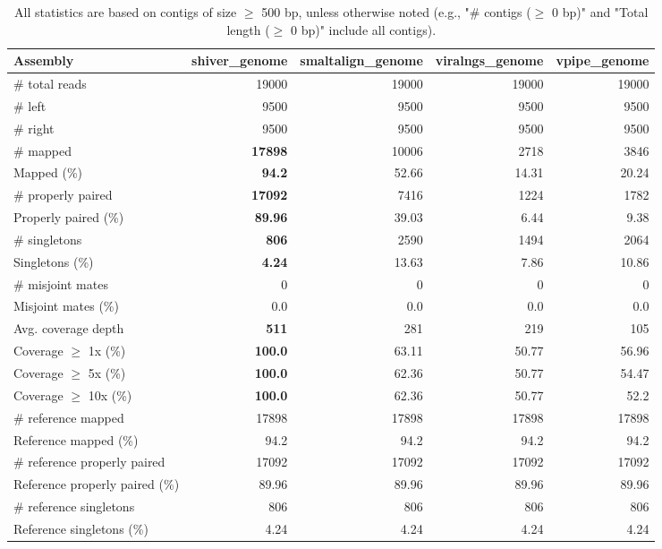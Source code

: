 \documentclass[12pt,a4paper]{article}
\begin{document}
\begin{table}[ht]
\begin{center}
\caption{All statistics are based on contigs of size $\geq$ 500 bp, unless otherwise noted (e.g., "\# contigs ($\geq$ 0 bp)" and "Total length ($\geq$ 0 bp)" include all contigs).}
\begin{tabular}{|l*{4}{|r}|}
\hline
Assembly & shiver\_genome & smaltalign\_genome & viralngs\_genome & vpipe\_genome \\ \hline
\# total reads & 19000 & 19000 & 19000 & 19000 \\ \hline
\# left & 9500 & 9500 & 9500 & 9500 \\ \hline
\# right & 9500 & 9500 & 9500 & 9500 \\ \hline
\# mapped & {\bf 17898} & 10006 & 2718 & 3846 \\ \hline
Mapped (\%) & {\bf 94.2} & 52.66 & 14.31 & 20.24 \\ \hline
\# properly paired & {\bf 17092} & 7416 & 1224 & 1782 \\ \hline
Properly paired (\%) & {\bf 89.96} & 39.03 & 6.44 & 9.38 \\ \hline
\# singletons & {\bf 806} & 2590 & 1494 & 2064 \\ \hline
Singletons (\%) & {\bf 4.24} & 13.63 & 7.86 & 10.86 \\ \hline
\# misjoint mates & 0 & 0 & 0 & 0 \\ \hline
Misjoint mates (\%) & 0.0 & 0.0 & 0.0 & 0.0 \\ \hline
Avg. coverage depth & {\bf 511} & 281 & 219 & 105 \\ \hline
Coverage $\geq$ 1x (\%) & {\bf 100.0} & 63.11 & 50.77 & 56.96 \\ \hline
Coverage $\geq$ 5x (\%) & {\bf 100.0} & 62.36 & 50.77 & 54.47 \\ \hline
Coverage $\geq$ 10x (\%) & {\bf 100.0} & 62.36 & 50.77 & 52.2 \\ \hline
\# reference mapped & 17898 & 17898 & 17898 & 17898 \\ \hline
Reference mapped (\%) & 94.2 & 94.2 & 94.2 & 94.2 \\ \hline
\# reference properly paired & 17092 & 17092 & 17092 & 17092 \\ \hline
Reference properly paired (\%) & 89.96 & 89.96 & 89.96 & 89.96 \\ \hline
\# reference singletons & 806 & 806 & 806 & 806 \\ \hline
Reference singletons (\%) & 4.24 & 4.24 & 4.24 & 4.24 \\ \hline

\end{tabular}
\end{center}
\end{table}
\end{document}
